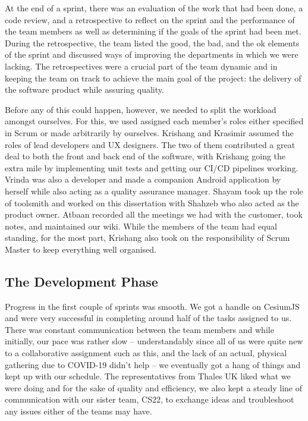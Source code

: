 \documentclass{l3proj}
\begin{document}
At the end of a sprint, there was an evaluation of the work that had been done, a code review\cite{coder}, and a retrospective\cite{retro} to reflect on the sprint and the performance of the team members as well as determining if the goals of the sprint had been met. During the retrospective, the team listed the good, the bad, and the ok elements of the sprint and discussed ways of improving the departments in which we were lacking. The retrospectives were a crucial part of the team dynamic and in keeping the team on track to achieve the main goal of the project: the delivery of the software product while assuring quality.

Before any of this could happen, however, we needed to split the workload amongst ourselves. For this, we used assigned each member's roles either specified in Scrum or made arbitrarily by ourselves. Krishang and Krasimir assumed the roles of lead developers and UX designers. The two of them contributed a great deal to both the front and back end of the software, with Krishang going the extra mile by implementing unit tests and getting our CI/CD pipelines working. Vrinda was also a developer and made a companion Android application by herself while also acting as a quality assurance manager. Shayam took up the role of toolsmith and worked on this dissertation with Shahzeb who also acted as the product owner. Atbaan recorded all the meetings we had with the customer, took notes, and maintained our wiki. While the members of the team had equal standing, for the most part, Krishang also took on the responsibility of Scrum Master\cite{ScrumMaster} to keep everything well organised.

\subsection{The Development Phase}

Progress in the first couple of sprints was smooth. We got a handle on CesiumJS and were very successful in completing around half of the tasks assigned to us. There was constant communication between the team members and while initially, our pace was rather slow – understandably since all of us were quite new to a collaborative assignment such as this, and the lack of an actual, physical gathering due to COVID-19 didn’t help – we eventually got a hang of things and kept up with our schedule. The representatives from Thales UK liked what we were doing and for the sake of quality and efficiency, we also kept a steady line of communication with our sister team, CS22, to exchange ideas and troubleshoot any issues either of the teams may have.
\end{document}
